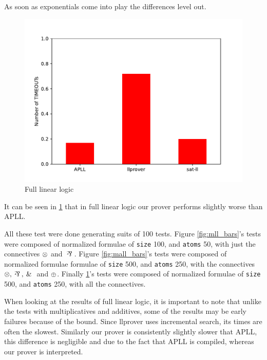 \documentclass[a4paper, 12pt, english]{report}
\begin{document}
As soon as exponentials come into play the differences level out.
\begin{figure}[h!]
	\centering
	\includegraphics[scale=0.5]{./images/cll-500-250.pdf}
	\caption{Full linear logic}
	\label{fig:cll_bars}
\end{figure}
It can be seen in \ref{fig:cll_bars} that in full linear logic our prover performs slightly worse than APLL.

All these test were done generating suits of 100 tests.
Figure \ref{fig:mll_bars}'s tests were composed of normalized formulae of \texttt{size} 100, and \texttt{atoms} 50, with just the connectives $\otimes$ and $\llpar$.
Figure \ref{fig:mall_bars}'s tests were composed of normalized formulae formulae of \texttt{size} 500, and \texttt{atoms} 250, with the connectives $\llten, \llpar, \llwith$ and $\oplus$.
Finally \ref{fig:cll_bars}'s tests were composed of normalized formulae of \texttt{size} 500, and \texttt{atoms} 250, with all the connectives.

When looking at the results of full linear logic, it is important to note that unlike the tests with multiplicatives and additives, some of the results may be early failures because of the bound.
Since llprover uses incremental search, its times are often the slowest.
Similarly our prover is consistently slightly slower that APLL, this difference is negligible and due to the fact that APLL is compiled, whereas our prover is interpreted.




\end{document}
